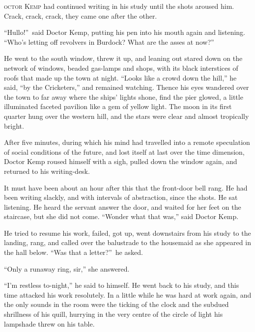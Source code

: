 \label{ch:17}
\begin{ChapterStart}
\vspace*{2\nbs}

\vspace{1.5\nbs}
\vspace{0.75\nbs}
\end{ChapterStart}

\kern-6pt\textsc{octor Kemp} had continued writing in his study until the shots aroused him. Crack, crack, crack, they came one after the other.

“Hullo!”\ said Doctor Kemp, putting his pen into his mouth again and listening. “Who’s letting off revolvers in Burdock? What are the asses at now?”

He went to the south window, threw it up, and leaning out stared down on the network of windows, beaded gas-lamps and shops, with its black interstices of roofs that made up the town at night. “Looks like a crowd down the hill,” he said, “by the Cricketers,” and remained watching. Thence his eyes wandered over the town to far away where the ships’ lights shone, find the pier glowed, a little illuminated faceted pavilion like a gem of yellow light. The moon in its first quarter hung over the western hill, and the stars were clear and almost tropically bright.

After five minutes, during which his mind had travelled into a remote speculation of social conditions of the future, and lost itself at last over the time dimension, Doctor Kemp roused himself with a sigh, pulled down the window again, and returned to his writing-desk.

It must have been about an hour after this that the front-door bell rang. He had been writing slackly, and with intervals of abstraction, since the shots. He sat listening. He heard the servant answer the door, and waited for her feet on the staircase, but she did not come. “Wonder what that was,” said Doctor Kemp.

He tried to resume his work, failed, got up, went downstairs from his study to the landing, rang, and called over the balustrade to the housemaid as she appeared in the hall below. “Was that a letter?”\ he asked.

“Only a runaway ring, sir,” she answered.

“I’m restless to-night,” he said to himself. He went back to his study, and this time attacked his work resolutely. In a little while he was hard at work again, and the only sounds in the room were the ticking of the clock and the subdued shrillness of his quill, hurrying in the very centre of the circle of light his lampshade threw on his table.

